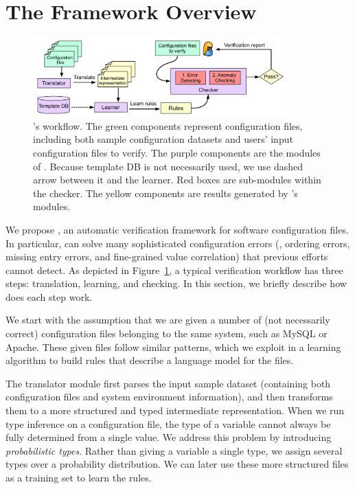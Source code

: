 
\section{The \app Framework Overview}

\begin{figure}[tbp] \centering
\includegraphics[width=0.88\textwidth]{figs/overview}
\caption{\app's workflow. The green components represent configuration 
  files, including both sample configuration datasets and users' input
  configuration files to verify. 
  The purple components are the modules of \app.
  Because template DB is not necessarily used, we use dashed
  arrow between it and the learner.
  Red boxes are sub-modules within the checker.
  The yellow components are results generated by \app's modules.}
\label{fig-overview}
\end{figure}

We propose \app, an automatic verification framework for 
software configuration files.
In particular, \app can solve many sophisticated 
configuration errors (\eg, ordering errors, missing entry errors,
and fine-grained value correlation) that previous efforts cannot 
detect. As depicted in Figure~\ref{fig-overview}, 
a typical \app verification workflow has three steps:
translation, learning, and checking. In this section, we briefly
describe how does each step work.

We start with the assumption 
that we are given a number of (not necessarily correct) 
configuration files belonging to the same system, 
such as MySQL or Apache. 
These given files follow similar patterns, which we exploit
in a learning algorithm to build rules that
describe a language model for the files.

The translator module first parses the input sample 
dataset (containing both configuration files and system environment
information), and then transforms them to a more structured
and typed intermediate representation.
When we run type inference on a configuration file, 
the type of a variable cannot always be fully determined from 
a single value.
We address this problem 
by introducing {\em probabilistic types}.
Rather than giving a variable a single type, 
we assign several types over a probability distribution. 
We can later use these more structured files
as a training set to learn the rules. 

